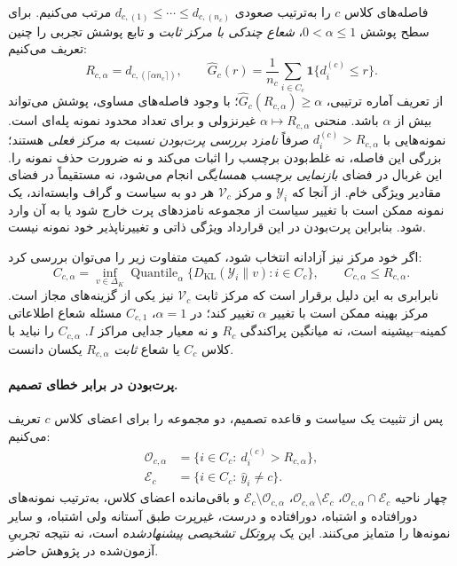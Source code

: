 فاصله‌های کلاس $c$ را به‌ترتیب صعودی
$d_{c,(1)}\le\cdots\le d_{c,(n_c)}$ مرتب می‌کنیم.
برای سطح پوشش $0<\alpha\le1$،
\emph{شعاع چندکی با مرکز ثابت} و
تابع پوشش تجربی را چنین تعریف می‌کنیم:
\begin{equation}\label{eq:ch3-outlier-quantile-coverage}
\boxed{
R_{c,\alpha}=d_{c,(\lceil\alpha n_c\rceil)},\qquad
\widehat G_c(r)=\frac1{n_c}
\sum_{i\in C_c}\mathbf 1\{d_i^{(c)}\le r\}.
}
\end{equation}
از تعریف آماره ترتیبی،
$\widehat G_c(R_{c,\alpha})\ge\alpha$؛
با وجود فاصله‌های مساوی، پوشش می‌تواند
بیش از $\alpha$ باشد.
منحنی $\alpha\mapsto R_{c,\alpha}$ غیرنزولی
و برای تعداد محدود نمونه پله‌ای است.
نمونه‌هایی با $d_i^{(c)}>R_{c,\alpha}$
صرفاً \emph{نامزد بررسی پرت‌بودن نسبت به مرکز فعلی}
هستند؛ بزرگی این فاصله، نه غلط‌بودن برچسب را
اثبات می‌کند و نه ضرورت حذف نمونه را.
این غربال در فضای \emph{بازنمایی برچسب همسایگی}
انجام می‌شود، نه مستقیماً در فضای مقادیر ویژگی خام.
از آنجا که $\mathscr Y_i$ و مرکز $\mathcal V_c$
هر دو به سیاست و گراف وابسته‌اند، یک نمونه ممکن است
با تغییر سیاست از مجموعه نامزدهای پرت خارج شود
یا به آن وارد شود. بنابراین پرت‌بودن در این قرارداد
ویژگی ذاتی و تغییرناپذیر خود نمونه نیست.

اگر خود مرکز نیز آزادانه انتخاب شود،
کمیت متفاوت زیر را می‌توان بررسی کرد:
\begin{equation}\label{eq:ch3-outlier-optimized-quantile}
C_{c,\alpha}=
\inf_{v\in\Delta_K}
\operatorname{Quantile}_{\alpha}
\bigl\{D_{\mathrm{KL}}(\mathscr Y_i\|v):i\in C_c\bigr\},
\qquad
C_{c,\alpha}\le R_{c,\alpha}.
\end{equation}
نابرابری به این دلیل برقرار است که مرکز
ثابت $\mathcal V_c$ نیز یکی از گزینه‌های مجاز است.
مرکز بهینه ممکن است با تغییر $\alpha$ تغییر کند؛
در $\alpha=1$، $C_{c,1}$ مسئله شعاع اطلاعاتی
کمینه--بیشینه است، نه میانگین پراکندگی $R_c$
و نه معیار جدایی مراکز $I$.
$C_{c,\alpha}$ را نباید با کلاس $C_c$ یا
شعاع \emph{ثابت} $R_{c,\alpha}$ یکسان دانست.

\paragraph{پرت‌بودن در برابر خطای تصمیم.}
پس از تثبیت یک سیاست و قاعده تصمیم، دو مجموعه
را برای اعضای کلاس $c$ تعریف می‌کنیم:
\begin{equation}\label{eq:ch3-outlier-error-sets}
\boxed{
\begin{aligned}
\mathcal O_{c,\alpha}
&=\{i\in C_c:\ d_i^{(c)}>R_{c,\alpha}\},\\
\mathcal E_c
&=\{i\in C_c:\ \widehat y_i\ne c\}.
\end{aligned}}
\end{equation}
چهار ناحیه
$\mathcal O_{c,\alpha}\cap\mathcal E_c$،
$\mathcal O_{c,\alpha}\setminus\mathcal E_c$،
$\mathcal E_c\setminus\mathcal O_{c,\alpha}$
و باقی‌مانده اعضای کلاس، به‌ترتیب
نمونه‌های دورافتاده و اشتباه، دورافتاده و درست،
غیرپرت طبق آستانه ولی اشتباه، و سایر نمونه‌ها
را متمایز می‌کنند. این یک
\emph{پروتکل تشخیصی پیشنهادشده} است،
نه نتیجه تجربیِ آزمون‌شده در پژوهش حاضر.

